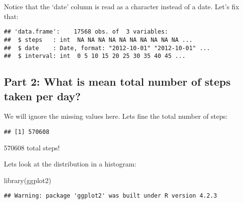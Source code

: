 \documentclass[
]{article}
\newenvironment{Shaded}{\begin{snugshade}}{\end{snugshade}}
\newcommand{\AttributeTok}[1]{\textcolor[rgb]{0.77,0.63,0.00}{#1}}
\newcommand{\ConstantTok}[1]{\textcolor[rgb]{0.00,0.00,0.00}{#1}}
\newcommand{\FunctionTok}[1]{\textcolor[rgb]{0.00,0.00,0.00}{#1}}
\newcommand{\NormalTok}[1]{#1}
\newcommand{\OtherTok}[1]{\textcolor[rgb]{0.56,0.35,0.01}{#1}}
\newcommand{\SpecialCharTok}[1]{\textcolor[rgb]{0.00,0.00,0.00}{#1}}
\begin{document}
Notice that the `date' column is read as a character instead of a date.
Let's fix that:

\begin{Shaded}
\end{Shaded}

\begin{verbatim}
## 'data.frame':    17568 obs. of  3 variables:
##  $ steps   : int  NA NA NA NA NA NA NA NA NA NA ...
##  $ date    : Date, format: "2012-10-01" "2012-10-01" ...
##  $ interval: int  0 5 10 15 20 25 30 35 40 45 ...
\end{verbatim}

\hypertarget{part-2-what-is-mean-total-number-of-steps-taken-per-day}{%
\subsection{Part 2: What is mean total number of steps taken per
day?}\label{part-2-what-is-mean-total-number-of-steps-taken-per-day}}

We will ignore the missing values here. Lets fine the total number of
steps:

\begin{Shaded}
\end{Shaded}

\begin{verbatim}
## [1] 570608
\end{verbatim}

570608 total steps!

Lets look at the distribution in a histogram:

\begin{Shaded}
\begin{Highlighting}[]
\FunctionTok{library}\NormalTok{(ggplot2)}
\end{Highlighting}
\end{Shaded}

\begin{verbatim}
## Warning: package 'ggplot2' was built under R version 4.2.3
\end{verbatim}
\end{document}
